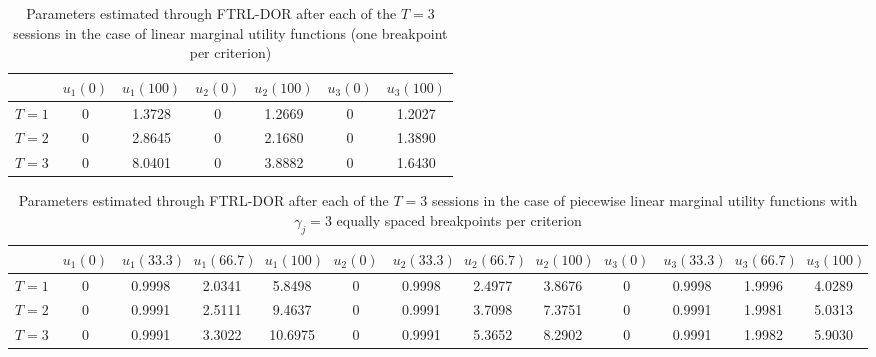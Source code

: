
\begin{table}[h!]
\centering
\caption{Parameters estimated through FTRL-DOR after each of the $T=3$ sessions in the case of linear marginal utility functions (one breakpoint per criterion)}
\label{tab:ftrl_lin}
\begin{tabular}{l|cc|cc|cc}
\toprule
&$u_1(0)$&$u_1(100)$&$u_2(0)$&$u_2(100)$&$u_3(0)$&$u_3(100)$\\
\midrule
$T=1$&0&1.3728&0&1.2669&0&1.2027\\
$T=2$&0&2.8645&0&2.1680&0&1.3890\\
$T=3$&0&8.0401&0&3.8882&0&1.6430\\
\bottomrule
\end{tabular}
\end{table}

\begin{table}[H]
\centering
\footnotesize
\caption{Parameters estimated through FTRL-DOR after each of the $T=3$ sessions in the case of piecewise linear marginal utility functions with $\gamma_j=3$ equally spaced breakpoints per criterion}
\label{tab:ftrl_pw}
\begin{tabularx}{\textwidth}{X|CCCC|CCCC|CCCC}
\toprule
&$u_{1}(0)$&$u_{1}(33.3)$&$u_{1}(66.7)$&$u_{1}(100)$&$u_{2}(0)$&$u_{2}(33.3)$&$u_{2}(66.7)$&$u_{2}(100)$&$u_{3}(0)$&$u_{3}(33.3)$&$u_{3}(66.7)$&$u_{3}(100)$\\
\midrule
$T=1$&0&0.9998&2.0341&5.8498&0&0.9998&2.4977&3.8676&0&0.9998&1.9996&4.0289\\
$T=2$&0&0.9991&2.5111&9.4637&0&0.9991&3.7098&7.3751&0&0.9991&1.9981&5.0313\\
$T=3$&0&0.9991&3.3022&10.6975&0&0.9991&5.3652&8.2902&0&0.9991&1.9982&5.9030\\
\bottomrule
\end{tabularx}
\end{table}
